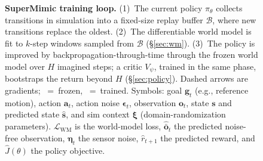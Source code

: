 \begin{figure}[t]
%
\caption{\textbf{SuperMimic training loop.} (1)~The current policy $\pi_\theta$ collects transitions in simulation into a fixed-size replay buffer $\mathcal{B}$, where new transitions replace the oldest. (2)~The differentiable world model is fit to $k$-step windows sampled from $\mathcal{B}$ (\S\ref{sec:wm}). (3)~The policy is improved by backpropagation-through-time through the frozen world model over $H$ imagined steps; a critic $V_\psi$, trained in the same phase, bootstraps the return beyond $H$ (\S\ref{sec:policy}). Dashed arrows are gradients; \frozenicon[0.28cm]~=~frozen, \trainicon[0.28cm]~=~trained. Symbols: goal $\bm{g}_t$ (e.g., reference motion), action $\bm{a}_t$, action noise $\bm{\epsilon}_t$, observation $\bm{o}_t$, state $\bm{s}$ and predicted state $\hat{\bm{s}}$, and sim context $\bm{\xi}$ (domain-randomization parameters). $\mathcal{L}_{\text{WM}}$ is the world-model loss, $\hat{\bar{\bm{o}}}_t$ the predicted noise-free observation, $\bm{\eta}_t$ the sensor noise, $\hat{r}_{t+1}$ the predicted reward, and $\hat{J}(\theta)$ the policy objective.}
\label{fig:pipeline}
\end{figure}

